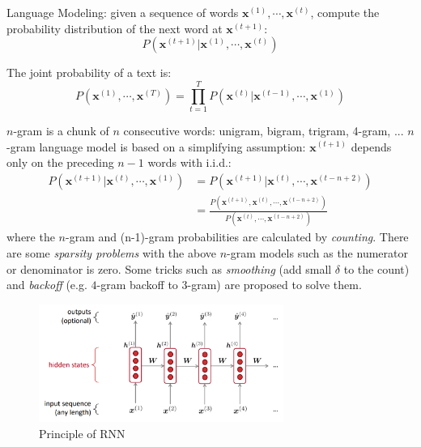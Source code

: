 Language Modeling: given a sequence of words $\bm{x}^{(1)}, \cdots, \bm{x}^{(t)}$, compute the probability distribution of the next word at $\bm{x}^{(t+1)}$:
\begin{equation}
P(\bm{x}^{(t+1)} | \bm{x}^{(1)}, \cdots, \bm{x}^{(t)})
\end{equation}

The joint probability of a text is:
\begin{equation}
P(\bm{x}^{(1)}, \cdots, \bm{x}^{(T)}) = \prod_{t=1}^T P(\bm{x}^{(t)} | \bm{x}^{(t-1)}, \cdots, \bm{x}^{(1)})
\end{equation}

$n$-gram is a chunk of $n$ consecutive words: unigram, bigram, trigram, 4-gram, ...
$n$-gram language model is based on a simplifying assumption: $\bm{x}^{(t+1)}$ depends only on the preceding $n-1$ words with i.i.d.:
\begin{align}
P(\bm{x}^{(t+1)} | \bm{x}^{(t)}, \cdots, \bm{x}^{(1)}) &= P(\bm{x}^{(t+1)} | \bm{x}^{(t)}, \cdots, \bm{x}^{(t-n+2)}) \nonumber \\
&= \frac{P(\bm{x}^{(t+1)}, \bm{x}^{(t)}, \cdots, \bm{x}^{(t-n+2)})}{P(\bm{x}^{(t)}, \cdots, \bm{x}^{(t-n+2)})} \nonumber
\end{align}
where the $n$-gram and (n-1)-gram probabilities are calculated by \emph{counting}.
There are some \emph{sparsity problems} with the above $n$-gram models such as the numerator or denominator is zero.
Some tricks such as \emph{smoothing} (add small $\delta$ to the count) and \emph{backoff} (e.g. $4$-gram backoff to $3$-gram) are proposed to solve them.

\begin{figure}[!thp]
	\centerline{\includegraphics[width=8.0cm]{figs/RNN.png}}
	\caption{Principle of RNN}
	\label{RNN}
\end{figure}



